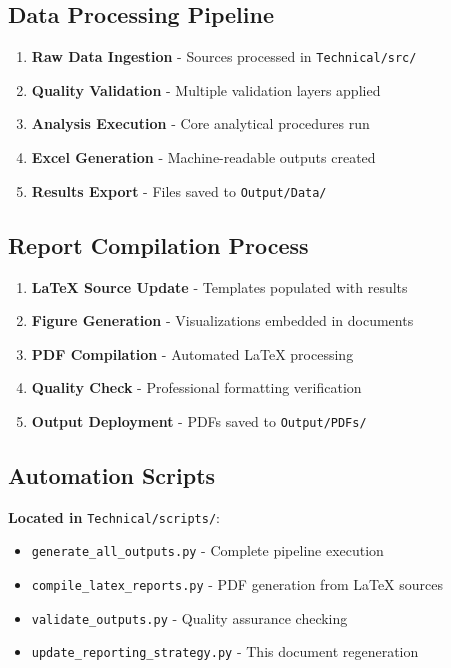\documentclass[11pt,letterpaper]{article}
\begin{document}
\subsection{Data Processing Pipeline}
\begin{enumerate}
    \item \textbf{Raw Data Ingestion} - Sources processed in \texttt{Technical/src/}
    \item \textbf{Quality Validation} - Multiple validation layers applied
    \item \textbf{Analysis Execution} - Core analytical procedures run
    \item \textbf{Excel Generation} - Machine-readable outputs created
    \item \textbf{Results Export} - Files saved to \texttt{Output/Data/}
\end{enumerate}

\subsection{Report Compilation Process}
\begin{enumerate}
    \item \textbf{LaTeX Source Update} - Templates populated with results
    \item \textbf{Figure Generation} - Visualizations embedded in documents
    \item \textbf{PDF Compilation} - Automated LaTeX processing
    \item \textbf{Quality Check} - Professional formatting verification
    \item \textbf{Output Deployment} - PDFs saved to \texttt{Output/PDFs/}
\end{enumerate}

\subsection{Automation Scripts}
\textbf{Located in} \texttt{Technical/scripts/}:
\begin{itemize}
    \item \texttt{generate\_all\_outputs.py} - Complete pipeline execution
    \item \texttt{compile\_latex\_reports.py} - PDF generation from LaTeX sources
    \item \texttt{validate\_outputs.py} - Quality assurance checking
    \item \texttt{update\_reporting\_strategy.py} - This document regeneration
\end{itemize}
\end{document}
